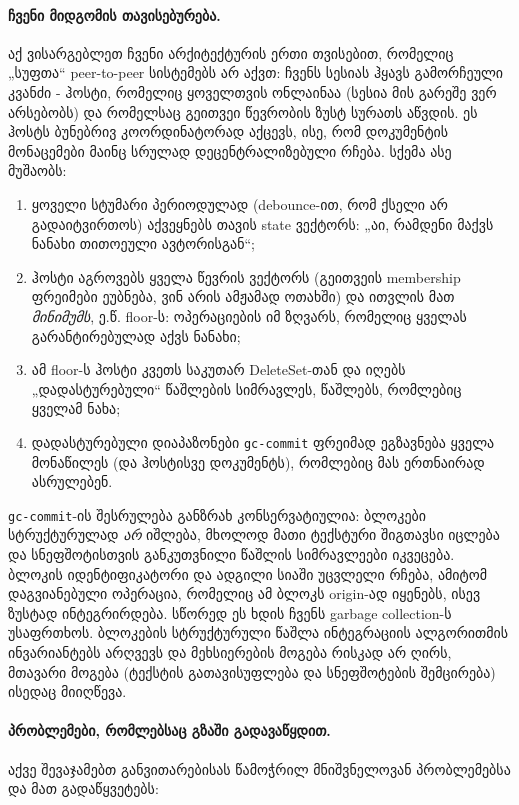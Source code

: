 \paragraph{ჩვენი მიდგომის თავისებურება.}
აქ ვისარგებლეთ ჩვენი არქიტექტურის ერთი თვისებით, რომელიც „სუფთა“
peer-to-peer სისტემებს არ აქვთ: ჩვენს სესიას ჰყავს გამორჩეული კვანძი -
ჰოსტი, რომელიც ყოველთვის ონლაინაა (სესია მის გარეშე ვერ არსებობს) და
რომელსაც გეითვეი წევრობის ზუსტ სურათს აწვდის. ეს ჰოსტს ბუნებრივ
კოორდინატორად აქცევს, ისე, რომ დოკუმენტის მონაცემები მაინც სრულად
დეცენტრალიზებული რჩება. სქემა ასე მუშაობს:

\begin{enumerate}[itemsep=0pt]
  \item ყოველი სტუმარი პერიოდულად (debounce-ით, რომ ქსელი არ გადაიტვირთოს)
        აქვეყნებს თავის state ვექტორს: „აი, რამდენი მაქვს
        ნანახი თითოეული ავტორისგან“;
  \item ჰოსტი აგროვებს ყველა წევრის ვექტორს (გეითვეის membership ფრეიმები
        ეუბნება, ვინ არის ამჟამად ოთახში) და ითვლის მათ \emph{მინიმუმს},
        ე.წ. floor-ს: ოპერაციების იმ ზღვარს, რომელიც ყველას გარანტირებულად
        აქვს ნანახი;
  \item ამ floor-ს ჰოსტი კვეთს საკუთარ DeleteSet-თან და იღებს
        „დადასტურებული“ წაშლების სიმრავლეს, წაშლებს, რომლებიც ყველამ
        ნახა;
  \item დადასტურებული დიაპაზონები \texttt{gc-commit} ფრეიმად ეგზავნება
        ყველა მონაწილეს (და ჰოსტისვე დოკუმენტს), რომლებიც მას
        ერთნაირად ასრულებენ.
\end{enumerate}

\texttt{gc-commit}-ის შესრულება განზრახ კონსერვატიულია: ბლოკები
სტრუქტურულად \emph{არ} იშლება, მხოლოდ მათი ტექსტური შიგთავსი იცლება და
სნეფშოტისთვის განკუთვნილი წაშლის სიმრავლეები იკვეცება. ბლოკის
იდენტიფიკატორი და ადგილი სიაში უცვლელი რჩება, ამიტომ დაგვიანებული
ოპერაცია, რომელიც ამ ბლოკს origin-ად იყენებს, ისევ ზუსტად ინტეგრირდება.
სწორედ ეს ხდის ჩვენს garbage collection-ს უსაფრთხოს. ბლოკების
სტრუქტურული წაშლა ინტეგრაციის ალგორითმის ინვარიანტებს არღვევს და
მეხსიერების მოგება რისკად არ ღირს, მთავარი მოგება (ტექსტის
გათავისუფლება და სნეფშოტების შემცირება) ისედაც მიიღწევა.

\paragraph{პრობლემები, რომლებსაც გზაში გადავაწყდით.}
აქვე შევაჯამებთ განვითარებისას წამოჭრილ მნიშვნელოვან პრობლემებსა და მათ
გადაწყვეტებს:

